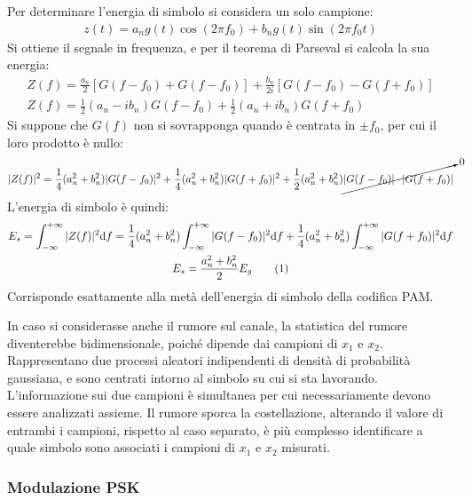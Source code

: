 \documentclass{article}
\newcommand{\df}{\mathrm{d}}
\newcommand{\intinf}{\displaystyle\int_{-\infty}^{+\infty}}
\newcommand{\tageq}{\tag{\stepcounter{equation}\theequation}}
\numberwithin{equation}{subsection}
\begin{document}
Per determinare l'energia di simbolo si considera un solo campione:
\begin{gather*}
    z(t)=a_ng(t)\cos(2\pi f_0)+b_ng(t)\sin(2\pi f_0t)
\end{gather*}
Si ottiene il segnale in frequenza, e per il teorema di Parseval si calcola la sua energia:
\begin{gather*}
    Z(f)=\displaystyle\frac{a_n}{2}\left[G(f-f_0)+G(f-f_0)\right]+\frac{b_n}{2i}\left[G(f-f_0)-G(f+f_0)\right]\\
    Z(f)=\displaystyle\frac{1}{2}(a_n-ib_n)G(f-f_0)+\frac{1}{2}(a_n+ib_n)G(f+f_0)
\end{gather*}
Si suppone che $G(f)$ non si sovrapponga quando è centrata in $\pm f_0$, per cui il loro prodotto è nullo:
\begin{gather*}
    |Z(f)|^2=\displaystyle\frac{1}{4}(a_n^2+b_n^2)|G(f-f_0)|^2+\frac{1}{4}(a_n^2+b_n^2)|G(f+f_0)|^2+\frac{1}{2}(a_n^2+b_n^2)\cancelto{0}{|G(f-f_0)|\cdot|G(f+f_0)|}
\end{gather*}
L'energia di simbolo è quindi:
\begin{gather*}
    E_s=\intinf |Z(f)|^2\df f=\frac{1}{4}(a_n^2+b_n^2)\intinf |G(f-f_0)|^2\df f+\frac{1}{4}(a_n^2+b_n^2)\intinf |G(f+f_0)|^2\df f\\
    E_s=\displaystyle\frac{a_n^2+b_n^2}{2}E_g\tageq
\end{gather*}
Corrisponde esattamente alla metà dell'energia di simbolo della codifica PAM. 

In caso si considerasse anche il rumore sul canale, la statistica del rumore diventerebbe bidimensionale, poiché dipende dai campioni di $x_1$ e $x_2$. Rappresentano 
due processi aleatori indipendenti di densità di probabilità gaussiana, e sono centrati intorno al simbolo su cui si sta lavorando. L'informazione sui due campioni è 
simultanea per cui necessariamente devono essere analizzati assieme. Il rumore sporca la costellazione, alterando il valore di entrambi i campioni, rispetto al 
caso separato, è più complesso identificare a quale simbolo sono associati i campioni di $x_1$ e $x_2$ misurati. 

\subsubsection{Modulazione PSK}
\end{document}
